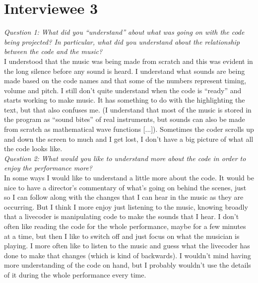 \section*{Interviewee 3}

\textit{Question 1: What did you ``understand'' about what was going on with the code being projected? In particular, what did you understand about the relationship between the code and the music?}
\\[12pt]
I understood that the music was being made from scratch and this was evident in the long silence before any sound is heard. I understand what sounds are being made based on the code names and that some of the numbers represent timing, volume and pitch.  I still don't quite understand when the code is ``ready'' and starts working to make music. It has something to do with the highlighting the text, but that also confuses me. (I understand that most of the music is stored in the program as ``sound bites'' of real instruments, but sounds can also be made from scratch as mathematical wave functions [...]). Sometimes the coder scrolls up and down the screen to much and I get lost, I don't have a big picture of what all the code looks like.
\\[24pt]
\textit{Question 2: What would you like to understand more about the code in order to enjoy the performance more?}
\\[12pt]
In some ways I would like to understand a little more about the code. It would be nice to have a director's commentary of what's going on behind the scenes, just so I can follow along with the changes that I can hear in the music as they are occurring. But I think I more enjoy just listening to the music, knowing broadly that a livecoder is manipulating code to make the sounds that I hear. I don't often like reading the code for the whole performance, maybe for a few minutes at a time, but then I like to switch off and just focus on what the musician is playing. I more often like to listen to the music and guess what the livecoder has done to make that changes (which is kind of backwards). I wouldn't mind having more understanding of the code on hand, but I probably wouldn't use the details of it during the whole performance every time.